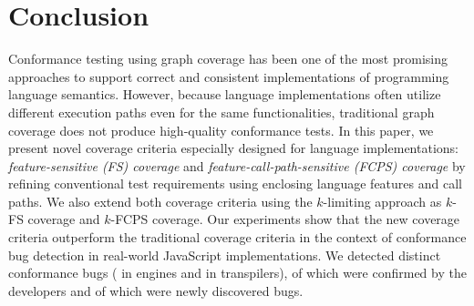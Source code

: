 \section{Conclusion}\label{sec:conclusion}
Conformance testing using graph coverage has been one of the most
promising approaches to support correct and consistent implementations
of programming language semantics.
However, because language implementations often utilize 
different execution paths even for the same functionalities,
traditional graph coverage does not produce high-quality conformance tests.
In this paper, we present novel coverage criteria especially designed
for language implementations: \textit{feature-sensitive (FS) coverage} and
\textit{feature-call-path-sensitive (FCPS) coverage}
by refining conventional test requirements using
enclosing language features and call paths.
We also extend both coverage criteria using the $k$-limiting approach as
$k$-FS coverage and $k$-FCPS coverage.
Our experiments show that the new coverage criteria outperform the
traditional coverage criteria in the context of conformance bug detection in
real-world JavaScript implementations.
We detected  distinct conformance bugs ( in engines
and  in transpilers),  of which were confirmed by the
developers and  of which were newly discovered bugs.
